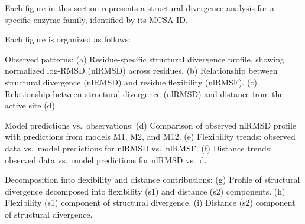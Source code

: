 \documentclass[
]{article}
\begin{document}
Each figure in this section represents a structural divergence analysis
for a specific enzyme family, identified by its MCSA ID.

Each figure is organized as follows:

Observed patterns: (a) Residue-specific structural divergence profile,
showing normalized log-RMSD (nlRMSD) across residues. (b) Relationship
between structural divergence (nlRMSD) and residue flexibility (nlRMSF).
(c) Relationship between structural divergence (nlRMSD) and distance
from the active site (d).

Model predictions vs.~observations: (d) Comparison of observed nlRMSD
profile with predictions from models M1, M2, and M12. (e) Flexibility
trends: observed data vs.~model predictions for nlRMSD vs.~nlRMSF. (f)
Distance trends: observed data vs.~model predictions for nlRMSD vs.~d.

Decomposition into flexibility and distance contributions: (g) Profile
of structural divergence decomposed into flexibility (s1) and distance
(s2) components. (h) Flexibility (s1) component of structural
divergence. (i) Distance (s2) component of structural divergence.
\end{document}
